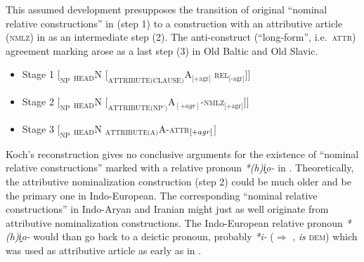 This assumed development presupposes the transition of original “nominal relative constructions” in  (step 1) to a construction with an attributive article (\textsc{nmlz}) in  as an intermediate step (2). The anti\hyp{}construct (“long-form”, i.e.~\textsc{attr}) agreement marking arose as a last step (3) in Old Baltic and Old Slavic.
\begin{itemize}
\item Stage 1 $[_{\text{NP}}$ $_{\text{HEAD}}$N $[_{\text{ATTRIBUTE(CLAUSE)}}$A$_{\text{[+{agr}]}}$ \textsc{rel}$_{\text{[-{agr}]}}$$] ]$
\item Stage 2 $[_{\text{NP}}$ $_{\text{HEAD}}$N $[_{\text{ATTRIBUTE(NP')}}$A$_{[+{agr}]}$-\textsc{nmlz}$_{\text{[+{agr}]}}$$] ]$ \label{koch constit nomzr}
\item Stage 3 $[_{\text{NP}}$ $_{\text{HEAD}}$N $_{\text{ATTRIBUTE(A)}}$A-\textsc{attr}$_{\text[+{agr}]}$$]$
\end{itemize}
Koch's reconstruction gives no conclusive arguments for the existence of “nominal relative constructions” marked with a relative pronoun \textit{*(h)i̭o-} in . Theoretically, the attributive nominalization construction (step 2) could be much older and be the primary one in Indo-European. The corresponding “nominal relative constructions” in Indo-Aryan and Iranian might just as well originate from attributive nominalization constructions. The Indo-European relative pronoun \textit{*(h)i̭o-} would than go back to a deictic pronoun, probably \textit{*i-} ($\Rightarrow$ ,  \textit{is} \textsc{dem}) which was used as attributive article as early as in .


